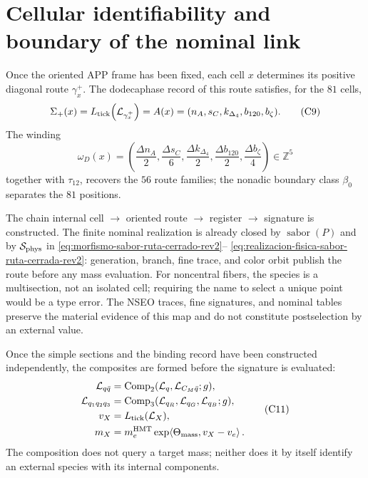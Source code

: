 \section{Cellular identifiability and boundary of the nominal link}
\label{sec:reconstruccion-interna-masas-rev6}

Once the oriented APP frame has been fixed, each cell \(x\) determines its positive diagonal
route \(\gamma_x^+\). The dodecaphase record of this route satisfies, for
the \(81\) cells,
\[
 \Sigma_+(x)
 =L_{\rm tick}\!\left(\mathcal L_{\gamma_x^+}\right)
 =A(x)
 =(n_A,s_C,k_{\Delta_4},b_{120},b_{\zeta}).
\tag{C9}\label{eq:extractor-reconstruccion-masa-rev6}
\]
The winding
\[
 \omega_D(x)=
 \left(
 \frac{\Delta n_A}{2},
 \frac{\Delta s_C}{6},
 \frac{\Delta k_{\Delta_4}}{2},
 \frac{\Delta b_{120}}{2},
 \frac{\Delta b_{\zeta}}{4}
 \right)
 \in\mathbb Z^5
\tag{C10}\label{eq:devanado-reconstruccion-masa-rev8}
\]
together with \(\tau_{12}\), recovers the \(56\) route families; the
nonadic boundary class \(\beta_0\) separates the \(81\) positions.

\begin{exactbox}[title={Exact scope of the result}]
The chain internal cell \(\to\) oriented route
\(\to\) register \(\to\) signature is constructed. The finite nominal realization is already
closed by \(\operatorname{sabor}(P)\) and by
\(\mathcal S_{\rm phys}\) in
\eqref{eq:morfismo-sabor-ruta-cerrado-rev2}--
\eqref{eq:realizacion-fisica-sabor-ruta-cerrada-rev2}: generation, branch,
fine trace, and color orbit publish the route before any mass
evaluation. For noncentral fibers, the species is a multisection, not an
isolated cell; requiring the name to select a unique point would be a type
error. The NSEO traces, fine signatures, and nominal tables preserve
the material evidence of this map and do not constitute postselection by an
external value.
\end{exactbox}

Once the simple sections and the binding record have been constructed
independently, the composites are formed before the signature is evaluated:
\[
 \begin{aligned}
 \mathcal L_{q\bar q}
   &=\operatorname{Comp}_2
     (\mathcal L_q,\mathcal L_{C_M\bar q};g),\\
 \mathcal L_{q_1q_2q_3}
   &=\operatorname{Comp}_3
     (\mathcal L_{q_R},\mathcal L_{q_G},\mathcal L_{q_B};g),\\
 v_X&=L_{\rm tick}(\mathcal L_X),\\
 m_X&=m_e^{\rm HMT}
   \exp\!\left\langle\Theta_{\rm mass},v_X-v_e\right\rangle.
 \end{aligned}
\tag{C11}\label{eq:reconstruccion-compuesta-masa-rev6}
\]
The composition does not query a target mass; neither does it by itself
identify an external species with its internal components.

